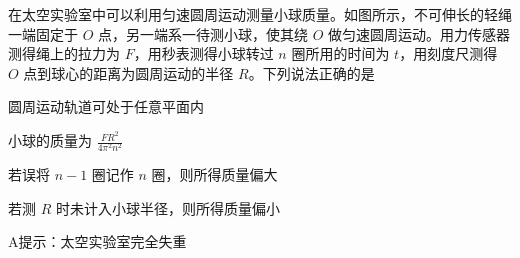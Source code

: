 在太空实验室中可以利用匀速圆周运动测量小球质量。如图所示，不可伸长的轻绳一端固定于 \( O \) 点，另一端系一待测小球，使其绕 \( O \) 做匀速圆周运动。用力传感器测得绳上的拉力为 \( F \)，用秒表测得小球转过 \( n \) 圈所用的时间为 \( t \)，用刻度尺测得 \( O \) 点到球心的距离为圆周运动的半径 \( R \)。下列说法正确的是\paren[]

\begin{choices}
	\item 圆周运动轨道可处于任意平面内
	\item 小球的质量为 \( \frac{FR^2}{4\pi^2 n^2} \)
	\item 若误将 \( n-1 \) 圈记作 \( n \) 圈，则所得质量偏大
	\item 若测 \( R \) 时未计入小球半径，则所得质量偏小
\end{choices}
\begin{answer}
	A\qquad 提示：太空实验室完全失重
\end{answer}
